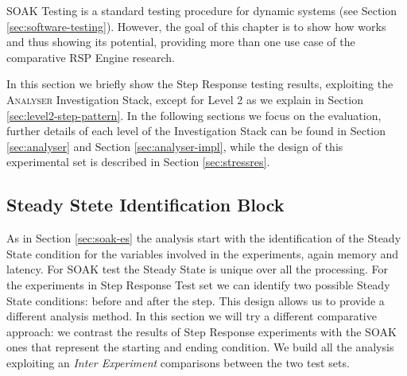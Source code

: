 SOAK Testing is a standard testing procedure for dynamic systems (see Section \ref{sec:software-testing}). However, the goal of this chapter is to show how \name works and thus showing its potential, providing more than one use case of the comparative RSP Engine research.

In this section we briefly show the Step Response testing results, exploiting the \textsc{Analyser} Investigation Stack, except for Level 2 as we explain in Section \ref{sec:level2-step-pattern}. In the following sections we focus on the evaluation, further details of each level of the Investigation Stack can be found in Section \ref{sec:analyser} and Section \ref{sec:analyser-impl}, while the design of this experimental set is described in Section \ref{sec:stressres}.



\subsection{Steady Stete Identification Block}\label{sec:level0-step-ssib}

As in Section \ref{sec:soak-es} the analysis start with the identification of the Steady State condition for the variables involved in the experiments, again memory and latency. For SOAK test the Steady State is unique over all the processing. For the experiments in Step Response Test set we can identify two possible Steady State conditions: before and after the step. This design allows us to provide a different analysis method. In this section we will try a different comparative approach: we contrast the results of Step Response experiments with the SOAK ones that represent the starting and ending condition. 
We build all the analysis exploiting an  \textit{Inter Experiment} comparisons between the two test sets.\\


